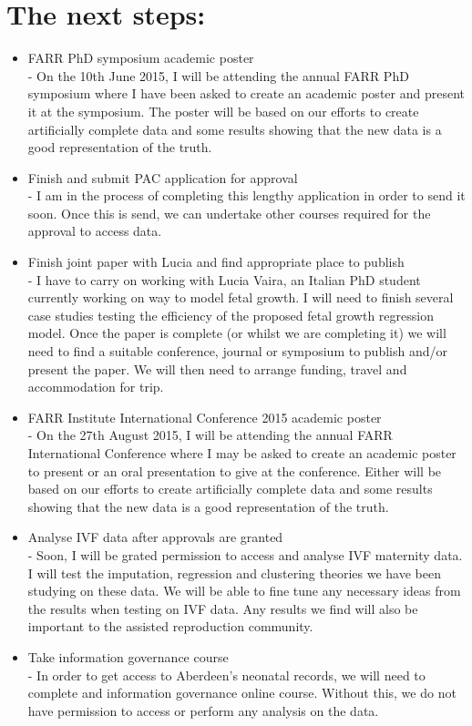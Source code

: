 \documentclass[bsc]{abdnthesis}
\begin{document}
\section{The next steps:} %
\label{sec:immediate_things_to_do_}
\begin{itemize}
	\item FARR PhD symposium academic poster \\ - On the 10th June 2015, I will be attending the annual FARR PhD symposium where I have been asked to create an academic poster and present it at the symposium. The poster will be based on our efforts to create artificially complete data and some results showing that the new data is a good representation of the truth.
	\item Finish and submit PAC application for approval \\ - I am in the process of completing this lengthy application in order to send it soon. Once this is send, we can undertake other courses required for the approval to access data. 
	\item Finish joint paper with Lucia and find appropriate place to publish \\ - I have to carry on working with Lucia Vaira, an Italian PhD student currently working on way to model fetal growth. I will need to finish several case studies testing the efficiency of the proposed fetal growth regression model. Once the paper is complete (or whilst we are completing it) we will need to find a suitable conference, journal or symposium to publish and/or present the paper. We will then need to arrange funding, travel and accommodation for trip.
	\item FARR Institute International Conference 2015 academic poster \\ - On the 27th August 2015, I will be attending the annual FARR International Conference where I may be asked to create an academic poster to present or an oral presentation to give at the conference. Either will be based on our efforts to create artificially complete data and some results showing that the new data is a good representation of the truth.
	\item Analyse IVF data after approvals are granted \\ - Soon, I will be grated permission to access and analyse IVF maternity data. I will test the imputation, regression and clustering theories we have been studying on these data. We will be able to fine tune any necessary ideas from the results when testing on IVF data. Any results we find will also be important to the assisted reproduction community. 	
	\item Take information governance course \\ - In order to get access to Aberdeen's neonatal records, we will need to complete and information governance online course. Without this, we do not have permission to access or perform any analysis on the data.  
\end{itemize}




\end{document}
